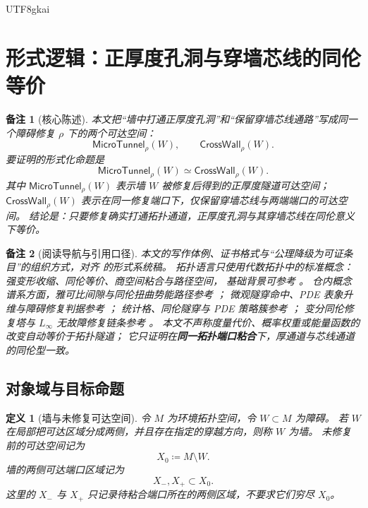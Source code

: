 \documentclass[12pt]{article}
\newtheorem{definition}{定义}[section]
\newtheorem{remark}{备注}[section]
\newcommand{\MicroTunnel}{\mathsf{MicroTunnel}}
\newcommand{\CrossWall}{\mathsf{CrossWall}}
\newcommand{\DefEq}{\coloneqq}
\begin{document}
\begin{CJK*}{UTF8}{gkai}
\section{形式逻辑：正厚度孔洞与穿墙芯线的同伦等价}
\label{sec:tex55-main}

\begin{remark}[核心陈述]
本文把“墙中打通正厚度孔洞”和“保留穿墙芯线通路”写成同一个障碍修复
\(\rho\) 下的两个可达空间：
\[
  \MicroTunnel_{\rho}(W),
  \qquad
  \CrossWall_{\rho}(W).
\]
要证明的形式化命题是
\[
  \boxed{
  \MicroTunnel_{\rho}(W)
  \simeq
  \CrossWall_{\rho}(W)
  }.
\]
其中 \(\MicroTunnel_{\rho}(W)\) 表示墙 \(W\) 被修复后得到的正厚度隧道可达空间；
\(\CrossWall_{\rho}(W)\) 表示在同一修复端口下，仅保留穿墙芯线与两端端口的可达空间。
结论是：只要修复确实打通拓扑通道，正厚度孔洞与其穿墙芯线在同伦意义下等价。
\end{remark}

\begin{remark}[阅读导航与引用口径]
本文的写作体例、证书格式与“公理降级为可证条目”的组织方式，对齐
\cite{RepoTex37SemanticGauge,RepoTex51TruthAnchor} 的形式系统稿。
拓扑语言只使用代数拓扑中的标准概念：强变形收缩、同伦等价、商空间粘合与路径空间，
基础背景可参考 \cite{Hatcher2002AT}。
仓内概念谱系方面，雅可比间隙与同伦扭曲势能路径参考
\cite{RepoTex28JacGap}；
微观隧穿命中、PDE 表象升维与障碍修复判据参考
\cite{RepoTex45ObstructionGlobalSection}；
统计格、同伦隧穿与 PDE 策略簇参考
\cite{RepoTex53StrategyCluster}；
变分同伦修复塔与 \(L_\infty\) 无故障修复链条参考
\cite{RepoTex17VariationalTower,RepoTex50LinftyRepair}。
本文不声称度量代价、概率权重或能量函数的改变自动等价于拓扑隧道；
它只证明在\textbf{同一拓扑端口粘合}下，厚通道与芯线通道的同伦型一致。
\end{remark}

\subsection{对象域与目标命题}
\label{subsec:tex55-objects}

\begin{definition}[墙与未修复可达空间]
\label{def:tex55-wall}
令 \(M\) 为环境拓扑空间，令 \(W\subset M\) 为障碍。
若 \(W\) 在局部把可达区域分成两侧，并且存在指定的穿越方向，则称 \(W\) 为墙。
未修复前的可达空间记为
\[
  X_0\DefEq M\setminus W.
\]
墙的两侧可达端口区域记为
\[
  X_-,X_+\subset X_0.
\]
这里的 \(X_-\) 与 \(X_+\) 只记录待粘合端口所在的两侧区域，不要求它们穷尽 \(X_0\)。
\end{definition}


\end{CJK*}
\end{document}
